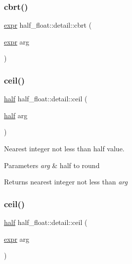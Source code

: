 \subsubsection{\texorpdfstring{cbrt()}{cbrt()}\hspace{0.1cm}{\footnotesize\ttfamily [2/2]}}
{\footnotesize\ttfamily \hyperlink{structhalf__float_1_1detail_1_1expr}{expr} half\+\_\+float\+::detail\+::cbrt (\begin{DoxyParamCaption}\item[{\hyperlink{structhalf__float_1_1detail_1_1expr}{expr}}]{arg }\end{DoxyParamCaption})\hspace{0.3cm}{\ttfamily [inline]}}

\mbox{\label{namespacehalf__float_1_1detail_a86421b3112018437512cf26b915ef979}} 
\subsubsection{\texorpdfstring{ceil()}{ceil()}\hspace{0.1cm}{\footnotesize\ttfamily [1/2]}}
{\footnotesize\ttfamily \hyperlink{classhalf__float_1_1half}{half} half\+\_\+float\+::detail\+::ceil (\begin{DoxyParamCaption}\item[{\hyperlink{classhalf__float_1_1half}{half}}]{arg }\end{DoxyParamCaption})\hspace{0.3cm}{\ttfamily [inline]}}

Nearest integer not less than half value. 
\begin{DoxyParams}{Parameters}
{\em arg} & half to round \\
\hline
\end{DoxyParams}
\begin{DoxyReturn}{Returns}
nearest integer not less than {\itshape arg} 
\end{DoxyReturn}
\mbox{\label{namespacehalf__float_1_1detail_a021a3543d2b972d72b770226b7c181df}} 
\subsubsection{\texorpdfstring{ceil()}{ceil()}\hspace{0.1cm}{\footnotesize\ttfamily [2/2]}}
{\footnotesize\ttfamily \hyperlink{classhalf__float_1_1half}{half} half\+\_\+float\+::detail\+::ceil (\begin{DoxyParamCaption}\item[{\hyperlink{structhalf__float_1_1detail_1_1expr}{expr}}]{arg }\end{DoxyParamCaption})\hspace{0.3cm}{\ttfamily [inline]}}

